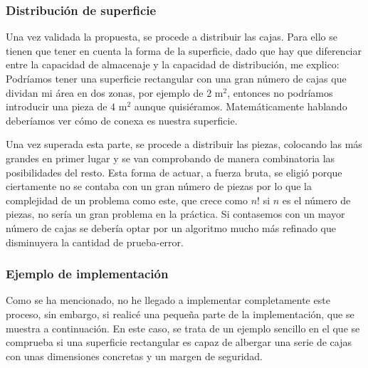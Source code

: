 \subsubsection{Distribución de superficie} 
Una vez validada la propuesta, se procede a distribuir las cajas. Para ello se tienen que tener en cuenta la forma de la superficie, dado que hay que diferenciar entre la capacidad de almacenaje y la capacidad de distribución, me explico: Podríamos tener una superficie rectangular con una gran número de cajas que dividan mi área en dos zonas, por ejemplo de $2$ m$^2$, entonces no podríamos introducir una pieza de $4$ m$^2$ aunque quisiéramos. Matemáticamente hablando deberíamos ver cómo de conexa es nuestra superficie.

Una vez superada esta parte, se procede a distribuir las piezas, colocando las más grandes en primer lugar y se van comprobando de manera combinatoria las posibilidades del resto. Esta forma de actuar, a fuerza bruta, se eligió porque ciertamente no se contaba con un gran número de piezas por lo que la complejidad de un problema como este, que crece como $n!$ si $n$ es el número de piezas, no sería un gran problema en la práctica. Si contasemos con un mayor número de cajas se debería optar por un algoritmo mucho más refinado que disminuyera la cantidad de prueba-error.

\subsubsection{Ejemplo de implementación}

Como se ha mencionado, no he llegado a implementar completamente este proceso, sin embargo, si realicé una pequeña parte de la implementación, que se muestra a continuación. En este caso, se trata de un ejemplo sencillo en el que se comprueba si una superficie rectangular es capaz de albergar una serie de cajas con unas dimensiones concretas y un margen de seguridad.

